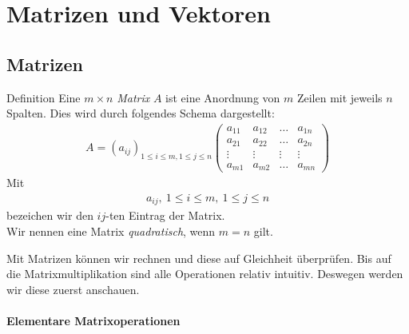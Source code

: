 \section{Matrizen und Vektoren}

\subsection{Matrizen}
\begin{mybox}{Definition}
Eine $m \times n$ \textit{Matrix} $A$ ist eine Anordnung von $m$ Zeilen mit jeweils $n$ Spalten.
Dies wird durch folgendes Schema dargestellt:
\begin{align*}
A = (a_{ij})_{1 \leq i \leq m,1 \leq j \leq n} 
\begin{pmatrix}
a_{11} & a_{12} & \dots & a_{1n}\\
a_{21} & a_{22} & \dots & a_{2n}\\
\vdots & \vdots & \vdots & \vdots\\
a_{m1} & a_{m2} & \hdots & a_{mn}
\end{pmatrix}
\end{align*}
Mit
\begin{align*}
a_{ij}, \ 1 \leq i \leq m, \ 1 \leq j \leq n
\end{align*}
bezeichen wir den $ij$-ten Eintrag der Matrix.\\
Wir nennen eine Matrix \textit{quadratisch}, wenn $m = n$ gilt.
\end{mybox}
Mit Matrizen können wir rechnen und diese auf Gleichheit überprüfen. 
Bis auf die Matrixmultiplikation sind alle Operationen relativ intuitiv.
Deswegen werden wir diese zuerst anschauen.\\
\\
\textbf{Elementare Matrixoperationen}
\renewcommand{\labelenumi}{\theenumi.}
